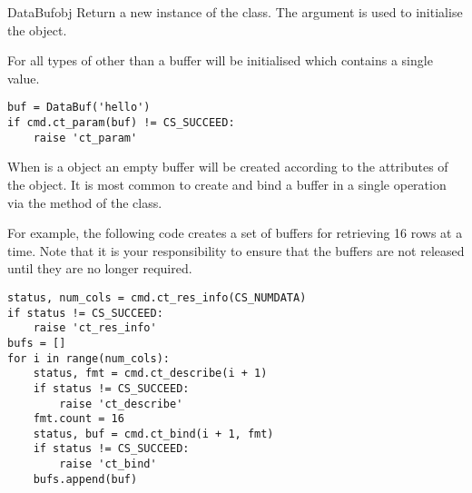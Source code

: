 \begin{funcdesc}{DataBuf}{obj}
Return a new instance of the  class.  The 
argument is used to initialise the  object.

For all types of  other than  a buffer will
be initialised which contains a single value.

\begin{verbatim}
buf = DataBuf('hello')
if cmd.ct_param(buf) != CS_SUCCEED:
    raise 'ct_param'
\end{verbatim}

When  is a  object an empty buffer will be
created according to the attributes of the  object.
It is most common to create and bind a buffer in a single operation
via the  method of the  class.

For example, the following code creates a set of buffers for
retrieving 16 rows at a time.  Note that it is your responsibility to
ensure that the buffers are not released until they are no longer
required.

\begin{verbatim}
status, num_cols = cmd.ct_res_info(CS_NUMDATA)
if status != CS_SUCCEED:
    raise 'ct_res_info'
bufs = []
for i in range(num_cols):
    status, fmt = cmd.ct_describe(i + 1)
    if status != CS_SUCCEED:
        raise 'ct_describe'
    fmt.count = 16
    status, buf = cmd.ct_bind(i + 1, fmt)
    if status != CS_SUCCEED:
        raise 'ct_bind'
    bufs.append(buf)
\end{verbatim}
\end{funcdesc}

